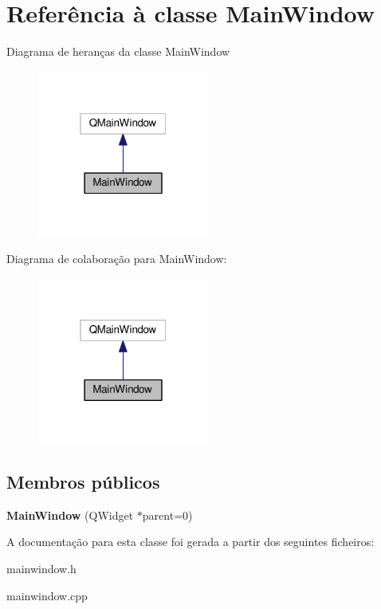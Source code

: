 \hypertarget{class_main_window}{}\section{Referência à classe Main\+Window}
\label{class_main_window}


Diagrama de heranças da classe Main\+Window\nopagebreak
\begin{figure}[H]
\begin{center}
\leavevmode
\includegraphics[width=160pt]{class_main_window__inherit__graph}
\end{center}
\end{figure}


Diagrama de colaboração para Main\+Window\+:\nopagebreak
\begin{figure}[H]
\begin{center}
\leavevmode
\includegraphics[width=160pt]{class_main_window__coll__graph}
\end{center}
\end{figure}
\subsection*{Membros públicos}
\begin{DoxyCompactItemize}
\item 
\mbox{\label{class_main_window_a8b244be8b7b7db1b08de2a2acb9409db}} 
{\bfseries Main\+Window} (Q\+Widget $\ast$parent=0)
\end{DoxyCompactItemize}


A documentação para esta classe foi gerada a partir dos seguintes ficheiros\+:\begin{DoxyCompactItemize}
\item 
mainwindow.\+h\item 
mainwindow.\+cpp\end{DoxyCompactItemize}

